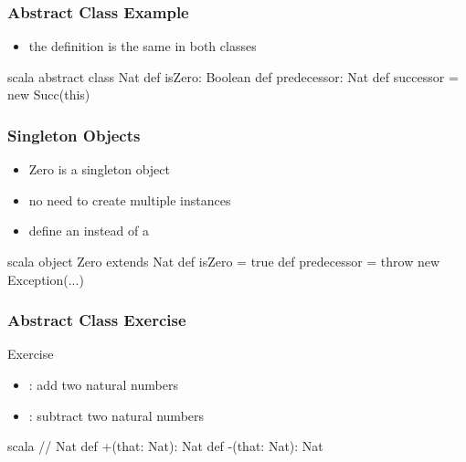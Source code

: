 \documentclass[dvipsnames]{beamer}
\theoremstyle{plain}
\begin{document}
\begin{frame}[fragile]
  \frametitle{Abstract Class Example}

  \begin{example}[Scala]
    \begin{itemize}
      \item the  definition is the same in both classes
    \end{itemize}

    \begin{pygments}{scala}
abstract class Nat {
    def isZero: Boolean
    def predecessor: Nat
    def successor = new Succ(this)
}
    \end{pygments}
  \end{example}
\end{frame}

\begin{frame}[fragile]
  \frametitle{Singleton Objects}

  \begin{example}[Scala]
    \begin{itemize}
      \item Zero is a singleton object
      \item no need to create multiple instances
      \item define an  instead of a 
    \end{itemize}

    \pause
    \medskip
    \begin{pygments}{scala}
object Zero extends Nat {
    def isZero = true
    def predecessor = throw new Exception(...)
}
    \end{pygments}
  \end{example}
\end{frame}

\begin{frame}[fragile]
  \frametitle{Abstract Class Exercise}

  \begin{block}{Exercise}
    \begin{itemize}
      \item {}: add two natural numbers
      \item {}: subtract two natural numbers
    \end{itemize}

    \begin{pygments}{scala}
// Nat
def +(that: Nat): Nat
def -(that: Nat): Nat
    \end{pygments}
  \end{block}
\end{frame}
\end{document}
